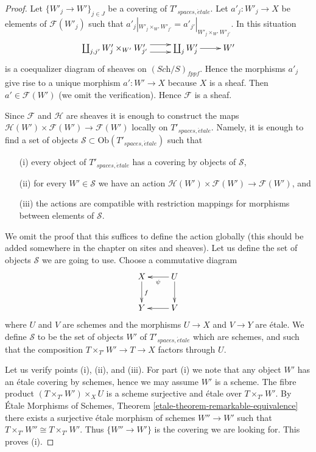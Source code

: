 \begin{proof}
Let $\{W'_j \to W'\}_{j \in J}$ be a covering of $T'_{spaces, \acute{e}tale}$.
Let $a'_j : W'_j \to X$ be elements of $\mathcal{F}(W'_j)$ such that
$a'_j|_{W'_j \times_{W'} W'_{j'}} = a'_{j'}|_{W'_j \times_{W'} W'_{j'}}$.
In this situation
$$
\xymatrix{
\coprod_{j, j'} W'_j \times_{W'} W'_{j'}
\ar@<1ex>[r]  \ar@<-1ex>[r] &
\coprod_j W'_j \ar[r] &
W'
}
$$
is a coequalizer diagram of sheaves on $(\textit{Sch}/S)_{fppf}$.
Hence the morphisms $a'_j$ give rise to a unique morphism $a' : W' \to X$
because $X$ is a sheaf. Then $a' \in \mathcal{F}(W')$ (we omit the
verification). Hence $\mathcal{F}$ is a sheaf.

\medskip\noindent
Since $\mathcal{F}$ and $\mathcal{H}$ are sheaves it is enough to construct
the maps $\mathcal{H}(W') \times \mathcal{F}(W') \to \mathcal{F}(W')$
locally on $T'_{spaces, \acute{e}tale}$. Namely, it is enough to find a set
of objects $\mathcal{S} \subset \text{Ob}(T'_{spaces, \acute{e}tale})$
such that
\begin{enumerate}
\item[(i)] every object of $T'_{spaces, \acute{e}tale}$ has a covering by
objects of $\mathcal{S}$,
\item[(ii)] for every $W' \in \mathcal{S}$ we have an action
$\mathcal{H}(W') \times \mathcal{F}(W') \to \mathcal{F}(W')$, and
\item[(iii)] the actions are compatible with restriction mappings for
morphisms between elements of $\mathcal{S}$.
\end{enumerate}
We omit the proof that this suffices to define the action globally
(this should be added somewhere in the chapter on sites and sheaves).
Let us define the set of objects $\mathcal{S}$ we are going to use.
Choose a commutative diagram
$$
\xymatrix{
X \ar[d]^f & U \ar[l]^\psi \ar[d] \\
Y & V \ar[l]
}
$$
where $U$ and $V$ are schemes and the morphisms $U \to X$ and $V \to Y$
are \'etale. We define $\mathcal{S}$ to be the set of objects $W'$ of
$T'_{spaces, \acute{e}tale}$ which are schemes, and such that the composition
$T \times_{T'} W' \to T \to X$ factors through $U$.

\medskip\noindent
Let us verify points (i), (ii), and (iii). For part (i) we note that
any object $W'$ has an \'etale covering by schemes, hence we may assume $W'$ is
a scheme. The fibre product $(T \times_{T'} W') \times_X U$
is a scheme surjective and \'etale over $T \times_{T'} W'$. By
\'Etale Morphisms of Schemes, Theorem \ref{etale-theorem-remarkable-equivalence}
there exists a surjective \'etale morphism of schemes $W'' \to W'$ such that
$T \times_{T'} W'' \cong T \times_{T'} W'$.
Thus $\{W'' \to W'\}$ is the covering we are looking for.
This proves (i).


\end{proof}
